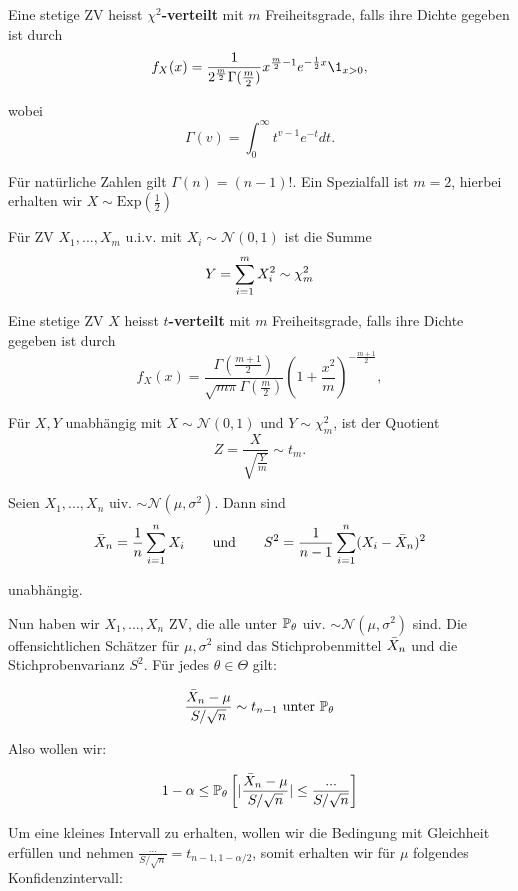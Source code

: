 
Eine stetige ZV heisst \textbf{$\chi^2$-verteilt} mit $m$ Freiheitsgrade, falls ihre Dichte gegeben ist durch
$$f_X(x) = \frac{1}{2^{\frac{m}{2}} \Gamma (\frac{m}{2})} x^{\frac{m}{2}-1} e^{-\frac{1}{2}x} \1_{x > 0},$$

wobei 
$$\Gamma(v) = \int_0^\infty t^{v-1} e^{-t} dt.$$

Für natürliche Zahlen gilt $\Gamma(n) = (n-1)!$. Ein Spezialfall ist $m = 2$, hierbei erhalten wir $X \sim \text{Exp}(\frac{1}{2})$ \medskip

\Satz Für ZV $X_1, ..., X_m$ u.i.v. mit $X_i \sim \mathcal{N}(0,1)$ ist die Summe 
$$Y = \sum\limits_{i=1}^m X_i^2 \sim \chi_m^2$$

Eine stetige ZV $X$ heisst \textbf{$t$-verteilt} mit $m$ Freiheitsgrade, falls ihre Dichte gegeben ist durch 
$$f_X(x) = \frac{\Gamma (\frac{m+1}{2})}{\sqrt{m \pi} \Gamma (\frac{m}{2})} \left( 1 + \frac{x^2}{m} \right)^{-\frac{m+1}{2}},$$

\Satz Für $X, Y$ unabhängig mit $X \sim \mathcal{N}(0,1)$ und $Y \sim \chi^2_m$, ist der Quotient
$$Z = \frac{X}{\sqrt{\frac{Y}{m}}} \sim t_m.$$


\columnbreak




\Satz Seien $X_1,...,X_n$ uiv. $\sim \mathcal{N}(\mu, \sigma^2)$. Dann sind
$$\Bar{X}_n = \frac{1}{n} \sum\limits_{i=1}^n X_i \qquad \text{und} \qquad S^2 = \frac{1}{n-1} \sum\limits_{i = 1}^n (X_i - \Bar{X}_n)^2$$

unabhängig. \smallskip

Nun haben wir $X_1,...,X_n$ ZV, die alle unter $\mathbb{P}_\theta$ uiv. $\sim \mathcal{N}(\mu, \sigma^2)$ sind. Die offensichtlichen Schätzer für $\mu, \sigma^2$ sind das Stichprobenmittel $\Bar{X}_n$ und die Stichprobenvarianz $S^2$. Für jedes $\theta \in \Theta$ gilt:

$$\frac{\Bar{X}_n - \mu}{S / \sqrt{n}} \sim t_{n-1} \text{ unter } \mathbb{P}_\theta$$

Also wollen wir:

$$1- \alpha \leq \mathbb{P}_\theta \left[ | \frac{\Bar{X}_n - \mu}{S / \sqrt{n}} | \leq \frac{...}{ S / \sqrt{n}} \right]$$

Um eine kleines Intervall zu erhalten, wollen wir die Bedingung mit Gleichheit erfüllen und nehmen $\frac{...}{ S / \sqrt{n}} = t_{n-1, 1 - \alpha / 2}$, somit erhalten wir für $\mu$ folgendes Konfidenzintervall:


